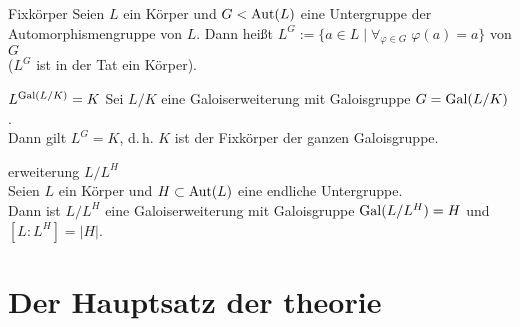 \linie

\begin{Def}{Fixkörper}
    Seien $L$ ein Körper und $G < \operatorname{Aut}(L)$ eine Untergruppe der
    Automorphismengruppe von $L$.
    Dann heißt $L^G := \{a \in L \;|\;
    \forall_{\varphi \in G}\; \varphi(a) = a\}$
     von $G$\\
    ($L^G$ ist in der Tat ein Körper).
\end{Def}

\begin{Prop}{$L^{\operatorname{Gal}(L/K)} = K$}
    Sei $L/K$ eine Galoiserweiterung mit Galoisgruppe $G = \operatorname{Gal}(L/K)$.\\
    Dann gilt $L^G = K$, d.\,h. $K$ ist der Fixkörper der ganzen Galoisgruppe.
\end{Prop}

\linie

\begin{Prop}{erweiterung $L/L^H$}\\
    Seien $L$ ein Körper und $H \subset \operatorname{Aut}(L)$ eine endliche Untergruppe.\\
    Dann ist $L/L^H$ eine Galoiserweiterung mit Galoisgruppe $\operatorname{Gal}(L/L^H) = H$
    und $[L : L^H] = |H|$.
\end{Prop}

\pagebreak

\section{%
    Der Hauptsatz der theorie%
}

